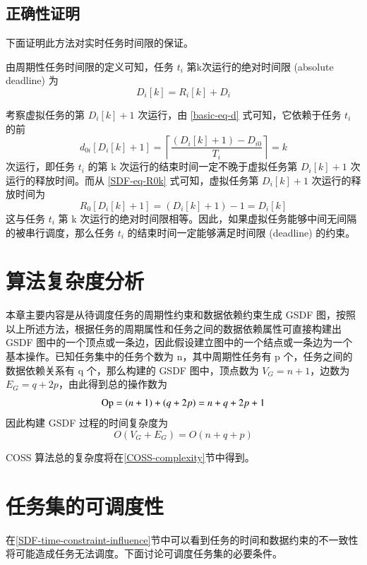 \subsection{正确性证明}

下面证明此方法对实时任务时间限的保证。

由周期性任务时间限的定义可知，任务 $t_i$ 第k次运行的绝对时间限 (absolute deadline) 为
\begin{equation}\label{SDF-eq-Dik}
  D_i[k]=R_i[k]+D_i
\end{equation}

考察虚拟任务的第 $D_i[k]+1$ 次运行，由 \eqref{basic-eq-d} 式可知，它依赖于任务 $t_i$ 的前
\begin{equation}\label{d0iDik}
  d_{0i}[D_i[k]+1]=\left\lceil\frac{(D_i[k]+1)-D_{i0}}{T_i}\right\rceil=k
\end{equation}
次运行，即任务 $t_i$ 的第 k 次运行的结束时间一定不晚于虚拟任务第 $D_i[k]+1$ 次运行的释放时间。而从 \eqref{SDF-eq-R0k} 式可知，虚拟任务第 $D_i[k]+1$ 次运行的释放时间为
\begin{equation}
  R_0[D_i[k]+1]=(D_i[k]+1)-1=D_i[k]
\end{equation}
这与任务 $t_i$ 第 k 次运行的绝对时间限相等。因此，如果虚拟任务能够中间无间隔的被串行调度，那么任务 $t_i$ 的结束时间一定能够满足时间限 (deadline) 的约束。

\section{算法复杂度分析}

本章主要内容是从待调度任务的周期性约束和数据依赖约束生成 GSDF 图，按照以上所述方法，根据任务的周期属性和任务之间的数据依赖属性可直接构建出 GSDF 图中的一个顶点或一条边，因此假设建立图中的一个结点或一条边为一个基本操作。已知任务集中的任务个数为 n，其中周期性任务有 p 个，任务之间的数据依赖关系有 q 个，那么构建的 GSDF 图中，顶点数为 $V_G=n+1$，边数为 $E_G=q+2p$，由此得到总的操作数为
$$\textnormal{Op}=(n+1)+(q+2p)=n+q+2p+1$$
因此构建 GSDF 过程的时间复杂度为
$$O(V_G+E_G)=O(n+q+p)$$

COSS 算法总的复杂度将在\ref{COSS-complexity}节中得到。

\section{任务集的可调度性}
在\ref{SDF-time-constraint-influence}节中可以看到任务的时间和数据约束的不一致性将可能造成任务无法调度。下面讨论可调度任务集的必要条件。

